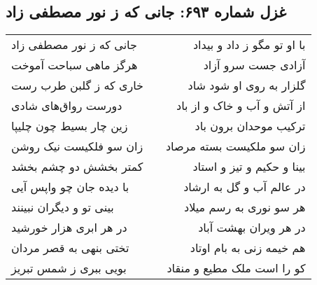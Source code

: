 \begin{center}
\section*{غزل شماره ۶۹۳: جانی که ز نور مصطفی زاد}
\label{sec:0693}
\begin{longtable}{l p{0.5cm} r}
جانی که ز نور مصطفی زاد
&&
با او تو مگو ز داد و بیداد
\\
هرگز ماهی سباحت آموخت
&&
آزادی جست سرو آزاد
\\
خاری که ز گلبن طرب رست
&&
گلزار به روی او شود شاد
\\
دورست رواق‌های شادی
&&
از آتش و آب و خاک و از باد
\\
زین چار بسیط چون چلیپا
&&
ترکیب موحدان برون باد
\\
زان سو فلکیست نیک روشن
&&
زان سو ملکیست بسته مرصاد
\\
کمتر بخشش دو چشم بخشد
&&
بینا و حکیم و تیز و استاد
\\
با دیده جان چو واپس آیی
&&
در عالم آب و گل به ارشاد
\\
بینی تو و دیگران نبینند
&&
هر سو نوری به رسم میلاد
\\
در هر ابری هزار خورشید
&&
در هر ویران بهشت آباد
\\
تختی بنهی به قصر مردان
&&
هم خیمه زنی به بام اوتاد
\\
بویی ببری ز شمس تبریز
&&
کو را است ملک مطیع و منقاد
\\
\end{longtable}
\end{center}
